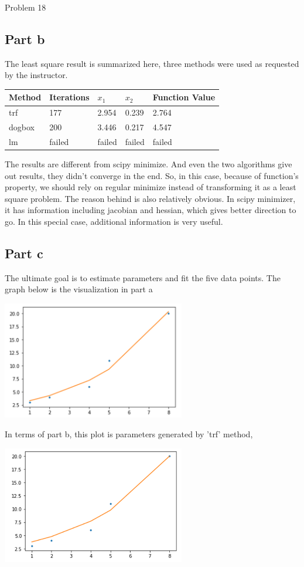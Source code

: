 \documentclass[10pt]{article}
\begin{document}
\begin{section}{Problem 18}
	\subsection{Part b}
	The least square result is summarized here, three methods were used as requested by the instructor.
	
	\begin{tabular}{lllll}
		\hline
		Method &Iterations & $x_1$ & $x_2$& Function Value \\
		\hline\hline
		trf  & 177  & 2.954  & 0.239 & 2.764    \\
		dogbox & 200   & 3.446  &  0.217 & 4.547    \\
		lm    & failed   & failed  & failed & failed
	\end{tabular}

    The results are different from scipy minimize. And even the two algorithms give out results, they didn't converge in the end. So, in this case, because of function's property, we should rely on regular minimize instead of transforming it as a least square problem. The reason behind is also relatively obvious. In scipy minimizer, it has information including jacobian and hessian, which gives better direction to go. In this special case, additional information is very useful.  
	
	\subsection{Part c}
	The ultimate goal is to estimate parameters and fit the five data points. The graph below is the visualization in part a
	
	\includegraphics[width=8cm]{img/problem18_plt1.png}
	
	In terms of part b, this plot is parameters generated by 'trf' method, 
	
	\includegraphics[width=8cm]{img/problem18_plt2.png}
	

\end{section}
\end{document}
